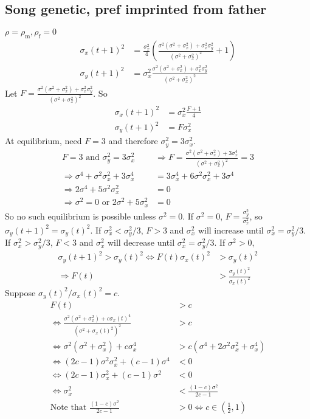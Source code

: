 \documentclass{article}
\newcommand{\x}[1]{\text{#1}}
\begin{document}
\subsection{Song genetic, pref imprinted from father }  $\rho=\rho_\x{m},\rho_\x{f}=0$
\begin{align*}
\sigma_x(t+1)^2&=\frac{\sigma_x^2}{4}\left(\frac{\sigma^2(\sigma^2+\sigma_x^2)+\sigma_x^2\sigma_y^2}{(\sigma^2+\sigma_x^2)^2}+1\right)
\\ \sigma_y(t+1)^2&=\sigma_x^2\frac{\sigma^2(\sigma^2+\sigma_x^2)+\sigma_x^2\sigma_y^2}{(\sigma^2+\sigma_x^2)^2}
\end{align*}
Let $F=\frac{\sigma^2(\sigma^2+\sigma_x^2)+\sigma_x^2\sigma_y^2}{(\sigma^2+\sigma_x^2)^2}$. So 
\begin{align*}
\sigma_x(t+1)^2&=\sigma_x^2\frac{F+1}{4}
\\ \sigma_y(t+1)^2&=F\sigma_x^2
\end{align*}
At  equilibrium, need $F=3$ and therefore $\sigma_y^2=3\sigma_x^2$.
\begin{align*}
F=3 \text{ and } \sigma_y^2=3\sigma_x^2 &\Rightarrow F=\frac{\sigma^2(\sigma^2+\sigma_x^2)+3\sigma_x^4}{(\sigma^2+\sigma_x^2)^2}=3
\\ \Rightarrow \sigma^4+\sigma^2\sigma_x^2+3\sigma_x^4&=3\sigma_x^4+6\sigma^2\sigma_x^2+3\sigma^4
\\ \Rightarrow 2\sigma^4+5\sigma^2\sigma_x^2&=0
\\ \Rightarrow \sigma^2=0 \text{ or } 2\sigma^2+5\sigma_x^2&=0 
\end{align*}
So no such equilibrium is possible unless $\sigma^2=0$. If $\sigma^2=0$, $F=\frac{\sigma_y^2}{\sigma_x^2}$, so $\sigma_y(t+1)^2=\sigma_y(t)^2$. If $\sigma_x^2<\sigma_y^2/3$, $F>3$ and $\sigma_x^2$ will increase until $\sigma_x^2=\sigma_y^2/3$. If $\sigma_x^2>\sigma_y^2/3$, $F<3$ and $\sigma_x^2$ will decrease until $\sigma_x^2=\sigma_y^2/3$. If $\sigma^2>0$, 
\begin{align*}
\sigma_y(t+1)^2>\sigma_y(t)^2 \Leftrightarrow F(t)\sigma_x(t)^2&>\sigma_y(t)^2
\\ \Rightarrow F(t)&> \frac{\sigma_y(t)^2}{\sigma_x(t)^2} 
\end{align*}
Suppose $\sigma_y(t)^2/\sigma_x(t)^2=c$.
\begin{align*}
F(t)&>c
\\ \Leftrightarrow \frac{\sigma^2(\sigma^2+\sigma_x^2)+c\sigma_x(t)^4}{(\sigma^2+\sigma_x(t)^2)^2}&>c
\\ \Leftrightarrow \sigma^2(\sigma^2+\sigma_x^2)+c\sigma_x^4&>c(\sigma^4+2\sigma^2\sigma_x^2+\sigma_x^4)
\\ \Leftrightarrow (2c-1)\sigma^2\sigma_x^2+(c-1)\sigma^4&<0
\\ \Leftrightarrow (2c-1)\sigma_x^2+(c-1)\sigma^2&<0
\\ \Leftrightarrow \sigma_x^2&<\frac{(1-c)\sigma^2}{2c-1}
\\\text{Note that } \frac{(1-c)\sigma^2}{2c-1}&>0 \Leftrightarrow c\in \left(\frac{1}{2},1\right)
\end{align*}
\end{document}
